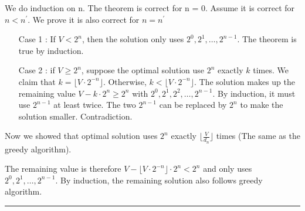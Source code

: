 \documentclass[twoside]{article}
\newenvironment{proof}{{\bf Proof:}}{\hfill\rule{2mm}{2mm}}
\begin{document}
\begin{proof}
We do induction on n. The theorem is correct for n = 0. Assume it is correct for \(n < n^\prime\). We prove it is also correct for \(n = n^\prime\)

\begin{itemize}
\item[Case 1 : ] If \(V < 2^n\), then the solution only uses \(2^0, 2^1, \ldots, 2^{n-1}\). The theorem is true by induction. 
\item[Case 2 : ] if \(V \geq 2^n\), suppose the optimal solution use \(2^n\) exactly \(k\) times. We claim that \(k = \lfloor V \cdot 2^{-n} \rfloor\). Otherwise, \(k < \lfloor V \cdot 2^{-n}\rfloor\). The solution makes up the remaining value \(V - k \cdot 2^n \geq 2^n\) with \(2^0, 2^1, 2^2, \ldots, 2^{n-1}\). By induction, it must use \(2^{n-1}\) at least twice. The two \(2^{n-1}\) can be replaced by \(2^n\) to make the solution smaller. Contradiction.
\end{itemize}

Now we showed that optimal solution uses \(2^n\) exactly \(\lfloor \frac{V}{d_n} \rfloor \) times (The same as the greedy algorithm). 

The remaining value is therefore \(V - \lfloor V \cdot 2^{-n} \rfloor \cdot 2^n < 2^n\) and only uses \(2^0, 2^1, \ldots, 2^{n-1}\). By induction, the remaining solution also follows greedy algorithm.

\end{proof}
\end{document}
